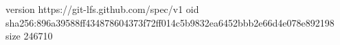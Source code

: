version https://git-lfs.github.com/spec/v1
oid sha256:896a39588ff434878604373f72ff014c5b9832ea6452bbb2e66d4e078e892198
size 246710
